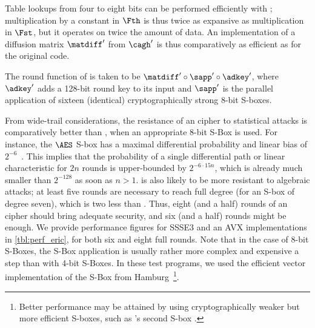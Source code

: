 Table lookups from four to eight bits can be performed efficiently with \pshufb; multiplication
by a constant in $\Fth$ is thus twice as expansive as multiplication in $\Fst$, but it operates
on twice the amount of data. An implementation of a diffusion matrix
$\matdiff'$ from $\cagh'$ is thus comparatively as efficient as for the original code. 

\medskip 

The round function of \eric is taken to be $\matdiff' \circ \sapp' \circ \adkey'$, where $\adkey'$ adds a
128-bit round key to its input and $\sapp'$ is the parallel application of sixteen (identical) cryptographically
strong 8-bit S-boxes.

From wide-trail considerations, the resistance of an \eric cipher to statistical attacks is comparatively better than \sam,
when an appropriate 8-bit S-Box is used.
For instance, the $\AES$ S-box has a maximal differential probability and linear bias of $2^{-6}$~\cite{aes}.
This implies that the probability of a single differential path or linear characteristic for $2n$ rounds
is upper-bounded by $2^{-6\cdot15 n}$, which is already much smaller than $2^{-128}$ as soon
as $n > 1$.
\eric is also likely to be more resistant to algebraic attacks; at least five rounds are necessary to reach
full degree (for an S-box of degree seven), which is two less than \sam.
Thus, eight (and a half) rounds of an \eric cipher should bring adequate security, and six (and a half) rounds might be enough.
We provide performance figures for SSSE3 and an AVX implementations in \autoref{tbl:perf_eric}, for both six and eight full rounds.
Note that in the case of 8-bit S-Boxes,
the S-Box application is usually rather more complex and expensive a step than with 4-bit S-Boxes. In these test programs, we used the efficient vector
implementation of the \AES{} S-Box from Hamburg~\cite{vpaes}\footnote{Better performance may be attained by using cryptographically
weaker but more efficient S-boxes, such as \whirlpool's second S-box \cite{whirlpool}.}.

